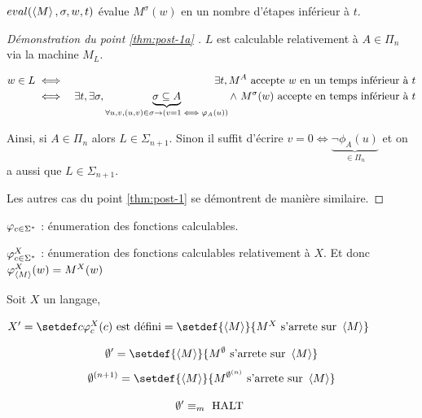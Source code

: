 \begin{definition}
	$eval(\left\langle M\right\rangle, \sigma,w,t)$ évalue $M^{\sigma}(w)$ en un nombre d'étapes inférieur à $t$.
\end{definition}

\begin{proof}[Démonstration du point \ref{thm:post-1a} \bimpRL]

	$L$ est calculable relativement à $A \in \Pi_n$ via la machine $M_L$.

	\begin{eqnarray*}
		w \in L &\iff& \exists t, M^A \text{ accepte } w \text{ en un temps inférieur à } t\\
		&\iff& \exists t, \exists \sigma,
		\underbrace{\sigma \subseteq A}_{\forall u,v, (u,v) \in \sigma \rightarrow (v=1 \iff \varphi_A(u))}
		\land\  M^{\sigma} (w) \text{ accepte en temps inférieur à }t
	\end{eqnarray*}

	Ainsi, si $A \in \Pi_n$ alors $L \in \Sigma_{n+1}$. Sinon il suffit d'écrire
	$v = 0 \iff \underbrace{\lnot \phi_A(u)}_{\in \Pi_n}$ et on a aussi que $L \in \Sigma_{n+1}$.

	Les autres cas du point \ref{thm:post-1} se démontrent de manière similaire.
\end{proof}

\begin{notation}
	$\varphi_{c \in \Sigma^{*}}$ : énumeration des fonctions calculables.

	$\varphi_{c \in \Sigma^{*}}^X$ : énumeration des fonctions calculables relativement à $X$. Et donc $\varphi_{\left\langle M\right\rangle}^X(w) = M^X(w)$
\end{notation}

\begin{definition}
	Soit $X$ un langage,

	$X' = \setdef c {\phi_c^X(c) \text{ est défini}} = \setdef {\encode M} {M^X \text{ s'arrete sur } \encode M}$

\end{definition}


\begin{definition}
	$$\emptyset' = \setdef {\encode M} {M^{\emptyset} \text{ s'arrete sur } \encode M}$$
	$$\emptyset^{(n+1)} = \setdef {\encode M} {M^{\emptyset^{(n)}} \text{ s'arrete sur } \encode M} $$
\end{definition}


\begin{remarque}
	$$\emptyset' \equiv_m \text{ HALT }$$
\end{remarque}


